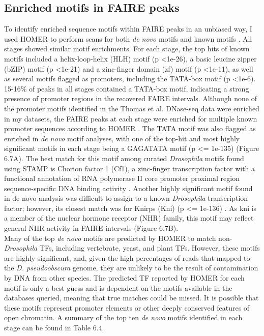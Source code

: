 \subsection{Enriched motifs in FAIRE peaks}
To identify enriched sequence motifs within FAIRE peaks in an unbiased way, I used HOMER to perform scans for both \emph{de novo} motifs and known motifs \citep{heinz_simple_2010}. All stages showed similar motif enrichments. For each stage, the top hits of known motifs included a helix-loop-helix (HLH) motif (p \textless 1e-26), a basic leucine zipper (bZIP) motif (p \textless 1e-21) and a zinc-finger domain (zf) motif (p \textless 1e-11), as well as several motifs flagged as promoters, including the TATA-box motif (p \textless 1e-6). 15-16\% of peaks in all stages contained a TATA-box motif, indicating a strong presence of promoter regions in the recovered FAIRE intervals. Although none of the promoter motifs identified in the Thomas et al. DNase-seq data were enriched in my datasets, the FAIRE peaks at each stage were enriched for multiple known promoter sequences according to HOMER \citep{thomas_dynamic_2011}. The TATA motif was also flagged as enriched in \emph{de novo} motif analyses, with one of the top-hit and most highly significant motifs in each stage being a GAGATATA motif (p \textless= 1e-135) (Figure 6.7A). The best match for this motif among curated \emph{Drosophila} motifs found using STAMP is Chorion factor 1 (Cf1), a zinc-finger transcription factor with a functional annotation of RNA polymerase II core promoter proximal region sequence-specific DNA binding activity \citep{mahony_stamp:_2007}. Another highly significant motif found in de novo analysis was difficult to assign to a known \emph{Drosophila} transcription factor; however, its closest match was for Knirps (Kni) (p \textless= 1e-136) . As kni is a member of the nuclear hormone receptor (NHR) family, this motif may reflect general NHR activity in FAIRE intervals (Figure 6.7B).\\

Many of the top \emph{de novo} motifs are predicted by HOMER to match non-\emph{Drosophila} TFs, including vertebrate, yeast, and plant TFs. However, these motifs are highly significant, and, given the high percentages of reads that mapped to the \emph{D. pseudoobscura} genome, they are unlikely to be the result of contamination by DNA from other species. The predicted TF reported by HOMER for each motif is only a best guess and is dependent on the motifs available in the databases queried, meaning that true matches could be missed. It is possible that these motifs represent promoter elements or other deeply conserved features of open chromatin. A summary of the top ten \emph{de novo} motifs identified in each stage can be found in Table 6.4.\\

